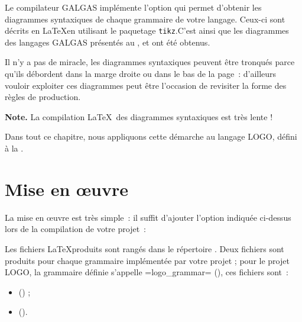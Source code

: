 

Le compilateur GALGAS implémente l'option  qui permet d'obtenir les diagrammes syntaxiques de chaque grammaire de votre langage. Ceux-ci sont décrits en \LaTeX en utilisant le paquetage \texttt{tikz}\label{tikz}.C'est ainsi que les diagrammes des langages GALGAS présentés au ,  et  ont été obtenus.

Il n'y a pas de miracle, les diagrammes syntaxiques peuvent être tronqués parce qu'ils débordent dans la marge droite ou dans le bas de la page~: d'ailleurs vouloir exploiter ces diagrammes peut être l'occasion de revisiter la forme des règles de production.

{\bf Note.} La compilation \LaTeX~des diagrammes syntaxiques est très lente !

Dans tout ce chapitre, nous appliquons cette démarche au langage LOGO, défini à la .

\section{Mise en œuvre}

La mise en œuvre est très simple~: il suffit d'ajouter l'option indiquée ci-dessus lors de la compilation de votre projet~:
\begin{description}
  \item[ ] 
\end{description}

Les fichiers \LaTeX produits sont rangés dans le répertoire . Deux fichiers sont produits pour chaque grammaire implémentée par votre projet ; pour le projet LOGO, la grammaire définie s'appelle \ggs=logo_grammar= (), ces fichiers sont~:
\begin{itemize}
\item {} () ;
\item {} ().
\end{itemize}


